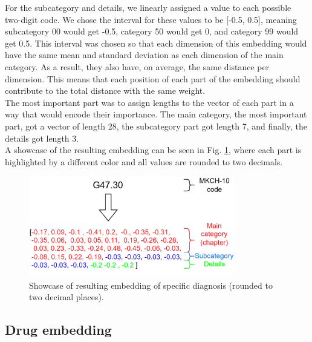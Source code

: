 For the subcategory and details, we linearly assigned a value to each possible two-digit code. We chose the interval for these values to be [-0.5, 0.5], meaning subcategory 00 would get -0.5, category 50 would get 0, and category 99 would get 0.5. This interval was chosen so that each dimension of this embedding would have the same mean and standard deviation as each dimension of the main category. As a result, they also have, on average, the same distance per dimension. This means that each position of each part of the embedding should contribute to the total distance with the same weight.
\\

The most important part was to assign lengths to the vector of each part in a way that would encode their importance. The main category, the most important part, got a vector of length 28, the subcategory part got length 7, and finally, the details got length 3.
\\

A showcase of the resulting embedding can be seen in Fig. \ref{fig:diag_emb_show}, where each part is highlighted by a different color and all values are rounded to two decimals.

\begin{figure}[!h]
	\centering
	
	\includegraphics[width=0.8\textwidth]{images/diagnosis_embed_showcase.png} 
	
	\caption{Showcase of resulting embedding of specific diagnosis (rounded to two decimal places).}
	\label{fig:diag_emb_show}
\end{figure} 


\subsection{Drug embedding}

